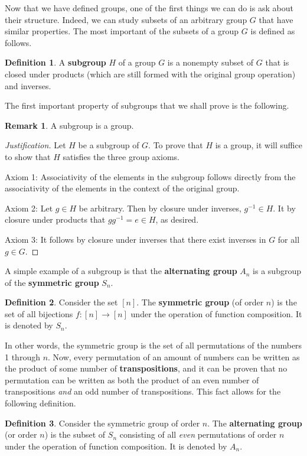 \documentclass[openany, amssymb, psamsfonts]{amsart}
\theoremstyle{definition}
\newtheorem{defn}{Definition}[section]
\newtheorem{rem}{Remark}[section]
\numberwithin{equation}{section}
\begin{document}
Now that we have defined groups, one of the first things we can do is ask about their structure. Indeed, we can study subsets of an arbitrary group $G$ that have similar properties. The most important of the subsets of a group $G$ is defined as follows.
\begin{defn}
    A \textbf{subgroup} $H$ of a group $G$ is a nonempty subset of $G$ that is closed under products (which are still formed with the original group operation) and inverses.
\end{defn}
The first important property of subgroups that we shall prove is the following.
\begin{rem}
    A subgroup is a group.
    \begin{proof}[Justification]
        Let $H$ be a subgroup of $G$. To prove that $H$ is a group, it will suffice to show that $H$ satisfies the three group axioms.\par\smallskip
        Axiom 1: Associativity of the elements in the subgroup follows directly from the associativity of the elements in the context of the original group.\par
        Axiom 2: Let $g\in H$ be arbitrary. Then by closure under inverses, $g^{-1}\in H$. It by closure under products that $gg^{-1}=e\in H$, as desired.\par
        Axiom 3: It follows by closure under inverses that there exist inverses in $G$ for all $g\in G$.
    \end{proof}
\end{rem}
A simple example of a subgroup is that the \textbf{alternating group} $A_n$ is a subgroup of the \textbf{symmetric group} $S_n$.
\begin{defn}
    Consider the set $[n]$. The \textbf{symmetric group} (of order $n$) is the set of all bijections $f:[n]\to[n]$ under the operation of function composition. It is denoted by $S_n$.
\end{defn}
In other words, the symmetric group is the set of all permutations of the numbers 1 through $n$. Now, every permutation of an amount of numbers can be written as the product of some number of \textbf{transpositions}, and it can be proven that no permutation can be written as both the product of an even number of transpositions \emph{and} an odd number of transpositions. This fact allows for the following definition.
\begin{defn}
    Consider the symmetric group of order $n$. The \textbf{alternating group} (or order $n$) is the subset of $S_n$ consisting of all \emph{even} permutations of order $n$ under the operation of function composition. It is denoted by $A_n$.
\end{defn}
\end{document}
